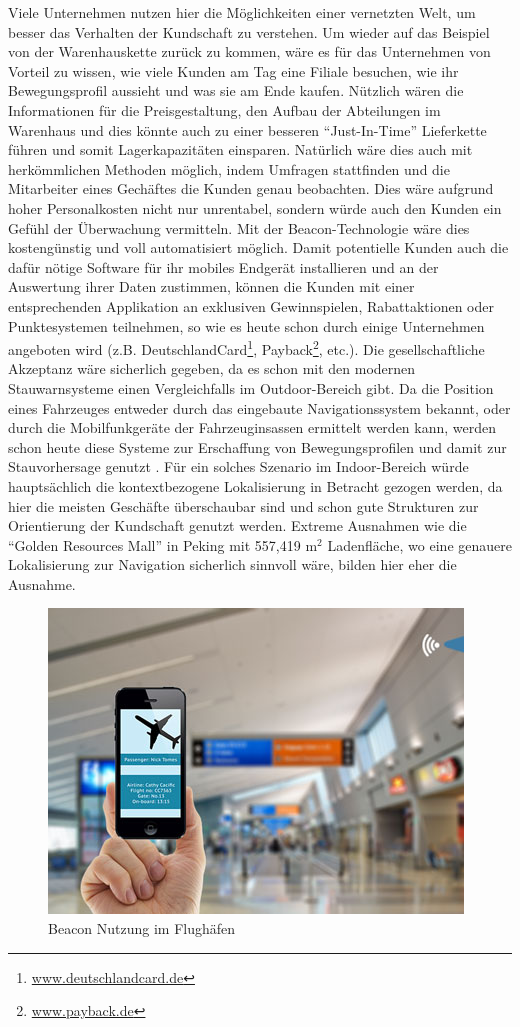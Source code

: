 Viele Unternehmen nutzen hier die Möglichkeiten einer vernetzten Welt, um besser das Verhalten der Kundschaft zu verstehen. Um wieder auf das Beispiel von der Warenhauskette zurück zu kommen, wäre es für das Unternehmen von Vorteil zu wissen, wie viele Kunden am Tag eine Filiale besuchen, wie ihr Bewegungsprofil aussieht und was sie am Ende kaufen. Nützlich wären die Informationen für die Preisgestaltung, den Aufbau der Abteilungen im Warenhaus und dies könnte auch zu einer besseren "`Just-In-Time"' Lieferkette führen und somit Lagerkapazitäten einsparen. Natürlich wäre dies auch mit herkömmlichen Methoden möglich, indem Umfragen stattfinden und die Mitarbeiter eines Gechäftes die Kunden genau beobachten. Dies wäre aufgrund hoher Personalkosten nicht nur unrentabel, sondern würde auch den Kunden ein Gefühl der Überwachung vermitteln. Mit der Beacon-Technologie wäre dies kostengünstig und voll automatisiert möglich. Damit potentielle Kunden auch die dafür nötige Software für ihr mobiles Endgerät installieren und an der Auswertung ihrer Daten zustimmen, können die Kunden mit einer entsprechenden Applikation an exklusiven Gewinnspielen, Rabattaktionen oder Punktesystemen teilnehmen, so wie es heute schon durch einige Unternehmen angeboten wird (z.B. DeutschlandCard\footnote{\url{www.deutschlandcard.de}}, Payback\footnote{\url{www.payback.de}}, etc.). Die gesellschaftliche Akzeptanz wäre sicherlich gegeben, da es schon mit den modernen Stauwarnsysteme einen Vergleichfalls im Outdoor-Bereich gibt. Da die Position eines Fahrzeuges entweder durch das eingebaute Navigationssystem bekannt, oder durch die Mobilfunkgeräte der Fahrzeuginsassen ermittelt werden kann, werden schon heute diese Systeme zur Erschaffung von Bewegungsprofilen und damit zur Stauvorhersage genutzt \cite{Stau}. Für ein solches Szenario im Indoor-Bereich würde hauptsächlich die kontextbezogene Lokalisierung in Betracht gezogen werden, da hier die meisten Geschäfte überschaubar sind und schon gute Strukturen zur Orientierung der Kundschaft genutzt werden. Extreme Ausnahmen wie die "`Golden Resources Mall"' in Peking mit 557,419 $\text{m}^2$ Ladenfläche, wo eine genauere Lokalisierung zur Navigation sicherlich sinnvoll wäre, bilden hier eher die Ausnahme. \par\bigskip
\begin{figure} 
\centering
\includegraphics[scale=0.5]{Bilder/iBeaconAirport}
\caption{Beacon Nutzung im Flughäfen \cite{Airpo}}
\label{Airpo}
\end{figure}

